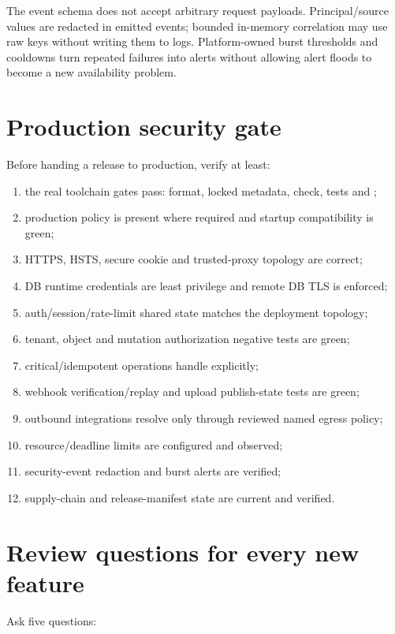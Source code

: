 The event schema does not accept arbitrary request payloads. Principal/source values are redacted in emitted events; bounded in-memory correlation may use raw keys without writing them to logs. Platform-owned burst thresholds and cooldowns turn repeated failures into alerts without allowing alert floods to become a new availability problem.

\section{Production security gate}

Before handing a release to production, verify at least:

\begin{enumerate}
  \item the real toolchain gates pass: format, locked metadata, check, tests and ;
  \item production policy is present where required and startup compatibility is green;
  \item HTTPS, HSTS, secure cookie and trusted-proxy topology are correct;
  \item DB runtime credentials are least privilege and remote DB TLS is enforced;
  \item auth/session/rate-limit shared state matches the deployment topology;
  \item tenant, object and mutation authorization negative tests are green;
  \item critical/idempotent operations handle  explicitly;
  \item webhook verification/replay and upload publish-state tests are green;
  \item outbound integrations resolve only through reviewed named egress policy;
  \item resource/deadline limits are configured and observed;
  \item security-event redaction and burst alerts are verified;
  \item supply-chain and release-manifest state are current and verified.
\end{enumerate}

\section{Review questions for every new feature}

Ask five questions:

